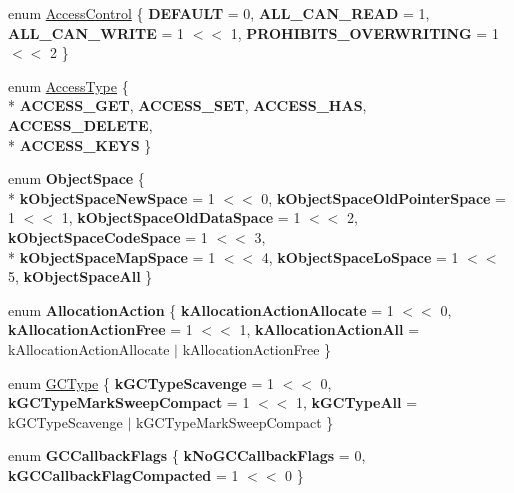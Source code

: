 \begin{DoxyCompactItemize}
\item 
enum \hyperlink{namespacev8_a31d8355cb043d7d2dda3f4a52760b64e}{Access\+Control} \{ {\bfseries D\+E\+F\+A\+U\+L\+T} = 0, 
{\bfseries A\+L\+L\+\_\+\+C\+A\+N\+\_\+\+R\+E\+A\+D} = 1, 
{\bfseries A\+L\+L\+\_\+\+C\+A\+N\+\_\+\+W\+R\+I\+T\+E} = 1 $<$$<$ 1, 
{\bfseries P\+R\+O\+H\+I\+B\+I\+T\+S\+\_\+\+O\+V\+E\+R\+W\+R\+I\+T\+I\+N\+G} = 1 $<$$<$ 2
 \}
\item 
enum \hyperlink{namespacev8_add8bef6469c5b94706584124e610046c}{Access\+Type} \{ \\*
{\bfseries A\+C\+C\+E\+S\+S\+\_\+\+G\+E\+T}, 
{\bfseries A\+C\+C\+E\+S\+S\+\_\+\+S\+E\+T}, 
{\bfseries A\+C\+C\+E\+S\+S\+\_\+\+H\+A\+S}, 
{\bfseries A\+C\+C\+E\+S\+S\+\_\+\+D\+E\+L\+E\+T\+E}, 
\\*
{\bfseries A\+C\+C\+E\+S\+S\+\_\+\+K\+E\+Y\+S}
 \}
\item 
\hypertarget{namespacev8_ae7bc5b0bd1100e94d78de255daa8ebc3}{}enum {\bfseries Object\+Space} \{ \\*
{\bfseries k\+Object\+Space\+New\+Space} = 1 $<$$<$ 0, 
{\bfseries k\+Object\+Space\+Old\+Pointer\+Space} = 1 $<$$<$ 1, 
{\bfseries k\+Object\+Space\+Old\+Data\+Space} = 1 $<$$<$ 2, 
{\bfseries k\+Object\+Space\+Code\+Space} = 1 $<$$<$ 3, 
\\*
{\bfseries k\+Object\+Space\+Map\+Space} = 1 $<$$<$ 4, 
{\bfseries k\+Object\+Space\+Lo\+Space} = 1 $<$$<$ 5, 
{\bfseries k\+Object\+Space\+All}
 \}\label{namespacev8_ae7bc5b0bd1100e94d78de255daa8ebc3}

\item 
\hypertarget{namespacev8_ae2b70dd2abba164d9ad9ffc9f757eca9}{}enum {\bfseries Allocation\+Action} \{ {\bfseries k\+Allocation\+Action\+Allocate} = 1 $<$$<$ 0, 
{\bfseries k\+Allocation\+Action\+Free} = 1 $<$$<$ 1, 
{\bfseries k\+Allocation\+Action\+All} = k\+Allocation\+Action\+Allocate $\vert$ k\+Allocation\+Action\+Free
 \}\label{namespacev8_ae2b70dd2abba164d9ad9ffc9f757eca9}

\item 
enum \hyperlink{namespacev8_ac109d6f27e0c0f9ef4e98bcf7a806cf2}{G\+C\+Type} \{ {\bfseries k\+G\+C\+Type\+Scavenge} = 1 $<$$<$ 0, 
{\bfseries k\+G\+C\+Type\+Mark\+Sweep\+Compact} = 1 $<$$<$ 1, 
{\bfseries k\+G\+C\+Type\+All} = k\+G\+C\+Type\+Scavenge $\vert$ k\+G\+C\+Type\+Mark\+Sweep\+Compact
 \}
\item 
\hypertarget{namespacev8_a247c37a849f4d6c293b9b16e94e1944b}{}enum {\bfseries G\+C\+Callback\+Flags} \{ {\bfseries k\+No\+G\+C\+Callback\+Flags} = 0, 
{\bfseries k\+G\+C\+Callback\+Flag\+Compacted} = 1 $<$$<$ 0
 \}\label{namespacev8_a247c37a849f4d6c293b9b16e94e1944b}

\end{DoxyCompactItemize}
